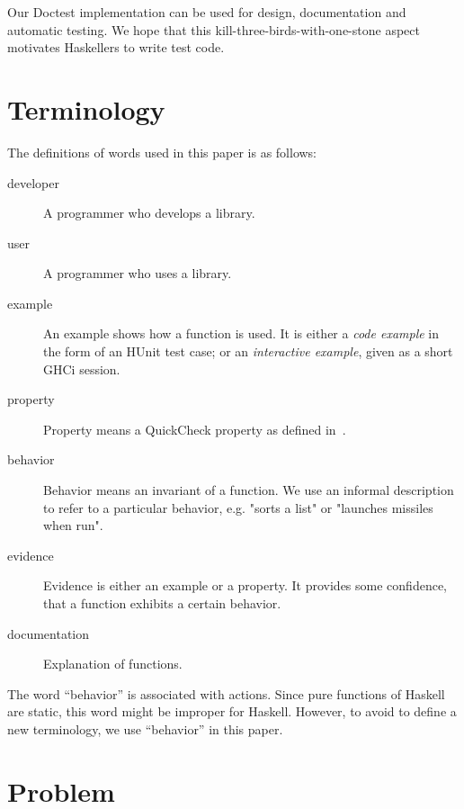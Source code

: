\documentclass[preprint]{sigplanconf}
\newcommand{\doctest}{Doctest}
\begin{document}
\noindent Our \doctest{} implementation
can be used for design, documentation and automatic testing.
We hope that this kill-three-birds-with-one-stone aspect
motivates Haskellers to write test code.

\section{Terminology}

The definitions of words used in this paper is as follows:

\begin{description}

\item[developer]
    A programmer who develops a library.

\item[user]
    A programmer who uses a library.

\item[example]
    An example shows how a function is used.  It is either a \emph{code
    example} in the form of an HUnit test case; or an \emph{interactive
    example}, given as a short GHCi session.

\item[property]
    Property means a QuickCheck property as defined in~\cite{quickcheck}.

\item[behavior]
    Behavior means an invariant of a function.  We use an informal description
    to refer to a particular behavior, e.g.  "sorts a list" or "launches
    missiles when run".

\item[evidence]
    Evidence is either an example or a property.  It provides some confidence,
    that a function exhibits a certain behavior.

\item[documentation]
    Explanation of functions.
\end{description}

The word ``behavior'' is associated with actions.
Since pure functions of Haskell are static,
this word might be improper for Haskell.
However, to avoid to define a new terminology,
we use ``behavior'' in this paper.

\section{Problem}
\end{document}
